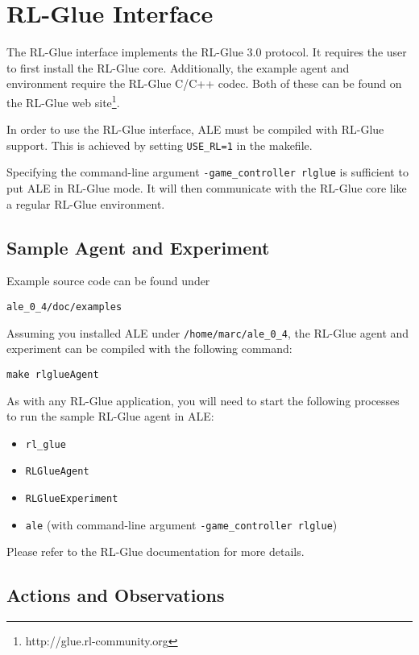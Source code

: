 \documentclass[12pt]{article}
\begin{document}
\section{RL-Glue Interface}\label{sec:rlglue_interface}

The RL-Glue interface implements the RL-Glue 3.0 protocol.
It requires the user to first install the RL-Glue core. Additionally, the example agent and 
environment require the RL-Glue C/C++ codec. Both of these can be found on the RL-Glue web
site\footnote{http://glue.rl-community.org}.

In order to use the RL-Glue interface, ALE must be compiled with RL-Glue support. This is achieved
by setting \verb+USE_RL=1+ in the makefile.

Specifying the command-line argument \verb+-game_controller rlglue+ is sufficient to put ALE in 
RL-Glue mode. It will then communicate with the RL-Glue core like a regular RL-Glue environment.

\subsection{Sample Agent and Experiment}

Example source code can be found under

\begin{verbatim}
ale_0_4/doc/examples
\end{verbatim}

Assuming you installed ALE under \verb+/home/marc/ale_0_4+, the RL-Glue agent and experiment
can be compiled with the following command: 

\begin{verbatim}
make rlglueAgent 
\end{verbatim}

As with any RL-Glue application, you will need to start the following processes to run the
sample RL-Glue agent in ALE:

\begin{itemize}
  \item{\verb+rl_glue+} 
  \item{\verb+RLGlueAgent+}
  \item{\verb+RLGlueExperiment+}
  \item{\verb+ale+ (with command-line argument \verb+-game_controller rlglue+)}
\end{itemize}

Please refer to the RL-Glue documentation for more details. 


\subsection{Actions and Observations}
\end{document}
